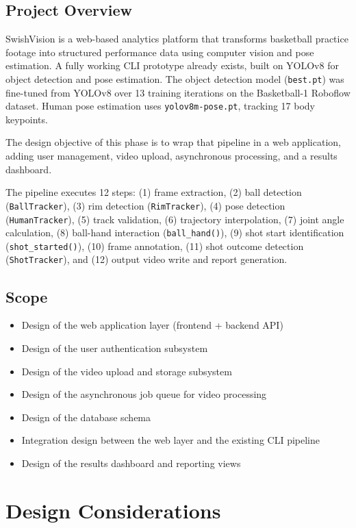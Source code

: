 ﻿\documentclass[11pt,a4paper]{article}
\begin{document}
\subsection{Project Overview}
SwishVision is a web-based analytics platform that transforms basketball practice footage into structured performance data using computer vision and pose estimation. A fully working CLI prototype already exists, built on YOLOv8 for object detection and pose estimation. The object detection model (\texttt{best.pt}) was fine-tuned from YOLOv8 over 13 training iterations on the Basketball-1 Roboflow dataset. Human pose estimation uses \texttt{yolov8m-pose.pt}, tracking 17 body keypoints.

The design objective of this phase is to wrap that pipeline in a web application, adding user management, video upload, asynchronous processing, and a results dashboard.

The pipeline executes 12 steps: (1) frame extraction, (2) ball detection (\texttt{BallTracker}), (3) rim detection (\texttt{RimTracker}), (4) pose detection (\texttt{HumanTracker}), (5) track validation, (6) trajectory interpolation, (7) joint angle calculation, (8) ball-hand interaction (\texttt{ball\_hand()}), (9) shot start identification (\texttt{shot\_started()}), (10) frame annotation, (11) shot outcome detection (\texttt{ShotTracker}), and (12) output video write and report generation.

\subsection{Scope}
\begin{itemize}[leftmargin=*]
    \item Design of the web application layer (frontend + backend API)
    \item Design of the user authentication subsystem
    \item Design of the video upload and storage subsystem
    \item Design of the asynchronous job queue for video processing
    \item Design of the database schema
    \item Integration design between the web layer and the existing CLI pipeline
    \item Design of the results dashboard and reporting views
\end{itemize}

\section{Design Considerations}
\end{document}
